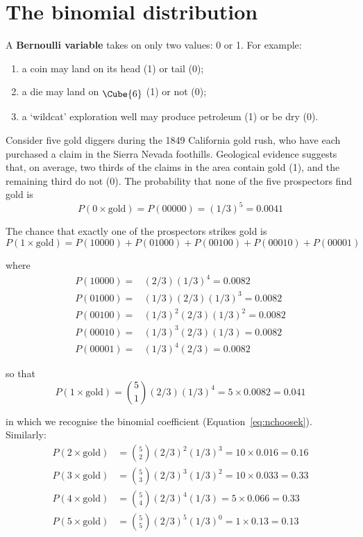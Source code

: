 \chapter{The binomial distribution}
\label{ch:binomial}

A \textbf{Bernoulli variable} takes on only two values: 0 or 1. For
example:

\begin{enumerate}
\item a coin may land on its head (1) or tail (0);
\item a die may land on $\raisebox{-2pt}{\Cube{6}}$ (1) or not (0);
\item a `wildcat' exploration well may produce petroleum (1) or be dry
  (0).
\end{enumerate}

Consider five gold diggers during the 1849 California gold rush, who
have each purchased a claim in the Sierra Nevada foothills. Geological
evidence suggests that, on average, two thirds of the claims in the
area contain gold (1), and the remaining third do not (0). The
probability that none of the five prospectors find gold is
\[
P(0\times\mbox{gold}) = P(00000) = (1/3)^5 = 0.0041
\]

The chance that exactly one of the prospectors strikes gold is
\[
P(1\times\mbox{gold}) = P(10000) + P(01000) + P(00100) + P(00010) + P(00001)
\]

\noindent where
\begin{align*}
  P(10000) = & (2/3) (1/3)^4 = 0.0082 \\
  P(01000) = & (1/3) (2/3) (1/3)^3 = 0.0082 \\
  P(00100) = & (1/3)^2 (2/3) (1/3)^2 = 0.0082 \\
  P(00010) = & (1/3)^3 (2/3) (1/3) = 0.0082 \\
  P(00001) = & (1/3)^4 (2/3) = 0.0082
\end{align*}

\noindent so that
\[
P(1\times\mbox{gold}) = \binom{5}{1} (2/3) (1/3)^4 = {5}\times{0.0082} = 0.041
\]

\noindent in which we recognise the binomial coefficient
(Equation~\ref{eq:nchoosek}). Similarly:
\begin{align*}
P(2\times\mbox{gold}) & = \binom{5}{2} (2/3)^2 (1/3)^3 = {10}\times{0.016} = 0.16\\
P(3\times\mbox{gold}) & = \binom{5}{3} (2/3)^3 (1/3)^2 = {10}\times{0.033} = 0.33\\
P(4\times\mbox{gold}) & = \binom{5}{4} (2/3)^4 (1/3) = {5}\times{0.066} = 0.33\\
P(5\times\mbox{gold}) & = \binom{5}{5} (2/3)^5 (1/3)^0 = {1}\times{0.13} = 0.13
\end{align*}

